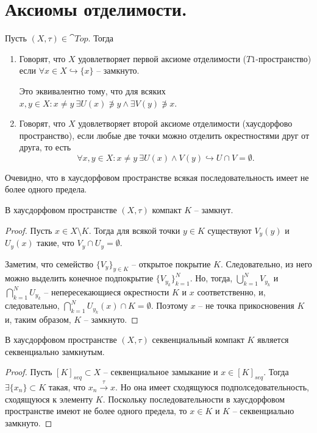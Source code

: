 \section{Аксиомы отделимости.}
\begin{definition}
    Пусть $(X, \tau) \in \cat{Top}$.
    Тогда
    \begin{enumerate}
        \item Говорят, что $X$ удовлетворяет первой аксиоме отделимости ($T1$-пространство) если $\forall x \in X \hookrightarrow \{x\}$ -- замкнуто.

        Это эквивалентно тому, что для всяких $x, y \in X\colon x \neq y \ \exists U(x) \not\ni y \wedge \exists V(y) \not\ni x$.
        \item Говорят, что $X$ удовлетворяет второй аксиоме отделимости (хаусдорфово пространство), если любые две точки можно отделить окрестностями друг от друга, то есть
        \[
            \forall x, y \in X\colon x \neq y \ \exists U(x) \wedge V(y) \hookrightarrow U \cap V = \emptyset.
        \]
    \end{enumerate}
\end{definition}
\begin{note}
    Очевидно, что в хаусдорфовом пространстве всякая последовательность имеет не более одного предела.
\end{note}
\begin{proposition}
    В хаусдорфовом пространстве $(X, \tau)$ компакт $K$ -- замкнут.
\end{proposition}
\begin{proof}
    Пусть $x \in X \setminus K$.
    Тогда для всякой точки $y \in K$ существуют $V_y(y)$ и $U_y(x)$ такие, что $V_y \cap U_y = \emptyset$.

    Заметим, что семейство $\{V_y\}_{y \in K}$ -- открытое покрытие $K$.
    Следовательно, из него можно выделить конечное подпокрытие $\{V_{y_k}\}_{k = 1}^{N}$.
    Но, тогда, $\bigcup_{k = 1}^{N} V_{y_k}$ и $\bigcap_{k = 1}^{N} U_{y_k}$ -- непересекающиеся окрестности $K$ и $x$ соответственно, и, следовательно, $\bigcap_{k = 1}^{N} U_{y_k}(x) \cap K = \emptyset$.
    Поэтому $x$ -- не точка прикосновения $K$ и, таким образом, $K$ -- замкнуто.
\end{proof}
\begin{proposition}
    В хаусдорфовом пространстве $(X, \tau)$ секвенциальный компакт $K$ является секвенциально замкнутым.
\end{proposition}
\begin{proof}
    Пусть $[K]_{seq} \subset X$ -- секвенциальное замыкание и $x \in [K]_{seq}$.
    Тогда $\exists \{x_n\} \subset K$ такая, что $x_n \xrightarrow{\tau} x$.
    Но она имеет сходящуюся подполседовательность, сходящуюся к элементу $K$.
    Поскольку последовательности в хаусдорфовом пространстве имеют не более одного предела, то $x \in K$ и $K$ -- секвенциально замкнуто.
\end{proof}
